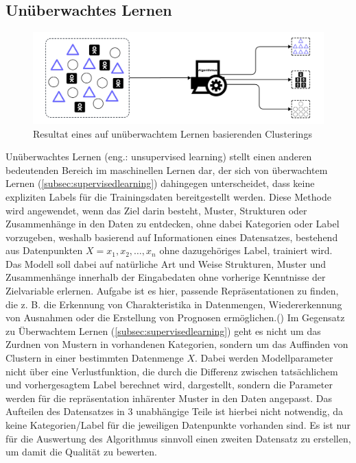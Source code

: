 \subsection{Unüberwachtes Lernen}
\begin{figure}[H]
	\centering
	\includegraphics[width=0.8\linewidth]{Bilder/unsupervised_sample.png}
	\caption{Resultat eines auf unüberwachtem Lernen basierenden Clusterings}
\end{figure}
Unüberwachtes Lernen (eng.: unsupervised learning) stellt einen anderen bedeutenden Bereich im maschinellen Lernen dar, der sich von überwachtem Lernen (\ref{subsec:supervisedlearning}) dahingegen unterscheidet, dass keine expliziten Labels für die Trainingsdaten bereitgestellt werden. Diese Methode wird angewendet, wenn das Ziel darin besteht, Muster, Strukturen oder Zusammenhänge in den Daten zu entdecken, ohne dabei Kategorien oder Label vorzugeben, weshalb basierend auf Informationen eines Datensatzes, bestehend aus Datenpunkten \textit{$X = x_1, x_2, \ldots, x_n$} ohne dazugehöriges Label, trainiert wird. Das Modell soll dabei auf natürliche Art und Weise Strukturen, Muster und Zusammenhänge innerhalb der Eingabedaten ohne vorherige Kenntnisse der Zielvariable erlernen. \glqq Aufgabe ist es hier, passende Repräsentationen zu finden, die z. B. die Erkennung von Charakteristika in Datenmengen, Wiedererkennung von Ausnahmen oder die Erstellung von Prognosen ermöglichen.\grqq (\cite[5]{lorenz_reinforcement_2020}) Im Gegensatz zu Überwachtem Lernen (\ref{subsec:supervisedlearning}) geht es nicht um das Zurdnen von Mustern in vorhandenen Kategorien, sondern um das Auffinden von Clustern in einer bestimmten Datenmenge $X$. Dabei werden Modellparameter nicht über eine Verlustfunktion, die durch die Differenz zwischen tatsächlichem und vorhergesagtem Label berechnet wird, dargestellt, sondern die Parameter werden für die repräsentation inhärenter Muster in den Daten angepasst. Das Aufteilen des Datensatzes in 3 unabhängige Teile ist hierbei nicht notwendig, da keine Kategorien/Label für die jeweiligen Datenpunkte vorhanden sind. Es ist nur für die Auswertung des Algorithmus sinnvoll einen zweiten Datensatz zu erstellen, um damit die Qualität zu bewerten.
